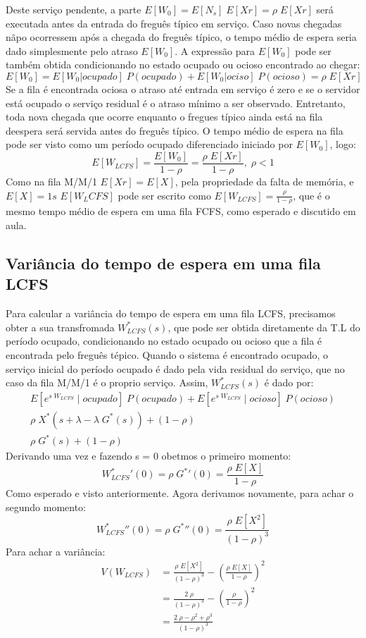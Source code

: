 \documentclass[a4paper]{article}
\newcommand{\E}[1]{E\!\left[#1\right]}
\begin{document}
Deste serviço pendente, a parte \(\E{W_0} = \E{N_s}\;\E{Xr} = \rho\;\E{Xr}\)
será executada antes da entrada do freguês típico em serviço.
Caso novas chegadas nãpo ocorressem após a chegada
do freguês típico, o tempo médio de espera seria dado simplesmente
pelo atraso \(\E{W_0}\). A expressão para \(\E{W_0}\) pode ser também
obtida condicionando no estado ocupado ou ocioso
encontrado ao chegar:
\[
    \E{W_0} = \E{W_0|ocupado} \; P(ocupado) + \E{W_0|ociso} \; P(ocioso) = \rho\;\E{Xr}
\]
Se a fila é encontrada ociosa o atraso até entrada em serviço é zero e se o servidor
está ocupado o serviço residual é o atraso mínimo a ser observado.
Entretanto, toda nova chegada que ocorre enquanto o fregues típico
ainda está na fila deespera será servida antes do freguês típico.
O tempo médio de espera na fila pode ser visto
como um período ocupado diferenciado iniciado por \(\E{W_0}\), logo:
\[
    \E{W_{LCFS}} = \frac{ \E{W_0}}{ 1-\rho} = \frac{ \rho\;\E{Xr}}{ 1-\rho},\;\rho < 1
\]
Como na fila M/M/1 \(\E{Xr} = \E{X}\), pela propriedade da falta de memória, e  \(\E{X} =1s\)
\(\E{W_LCFS}\) pode ser escrito como
\(\E{W_{LCFS}} = \frac{\rho}{1 - \rho}\), que
é o mesmo tempo médio de espera em uma fila FCFS, como esperado e discutido em aula.
\subsection{Variância do tempo de espera em uma fila LCFS}
Para calcular a variância do tempo de espera em uma fila LCFS, precisamos obter
a sua transfromada \(W_{LCFS}^*(s)\), que pode ser obtida diretamente da T.L
do período ocupado, condicionando no estado ocupado ou ocioso que a fila  é encontrada pelo freguês tépico.
Quando o sistema é encontrado ocupado, o serviço inicial do período ocupado  é dado pela vida residual do
serviço, que no caso da fila M/M/1 é o proprio serviço.
Assim, \(W_{LCFS}^*(s)\) é dado por:
\begin{align*}
    \E{e^{s \; W_{LCFS}} \;|\; ocupado} \; P(ocupado)
        + \E{e^{s \; W_{LCFS}} \;|\; ocioso} \; P(ocioso) \\
    \rho \; X^*(s + \lambda - \lambda \; G^*(s)) + (1 - \rho) \\
    \rho \; G^*(s) + (1 - \rho)
\end{align*}
Derivando uma vez e fazendo s = 0 obetmos o primeiro momento:
\[
    {W_{LCFS}^*}'(0)
        = \rho \; {G^*}'(0) = \frac{\rho \; \E{X}}{1 - \rho}
\]
Como esperado e visto anteriormente. Agora derivamos novamente, para achar o segundo momento:
\[
    {W_{LCFS}^*}''(0)
        = \rho \; {G^*}''(0)
        = \frac{\rho \; \E{X^2}}{(1 - \rho)^3}
\]
Para achar a variância:
\begin{align*}
    V(W_{LCFS}) &=
        \frac{\rho \; \E{X^2}}{(1 - \rho)^3}
        - \left( \frac{\rho \; \E{X}}{1-\rho} \right)^2 \\
    &= \frac{2 \; \rho}{(1 - \rho)^3}
        - \left( \frac{\rho}{1 - \rho} \right)^2 \\
    &= \frac{2 \; \rho - \rho^2 + \rho^3}{(1 - \rho)^3}
\end{align*}
\end{document}
